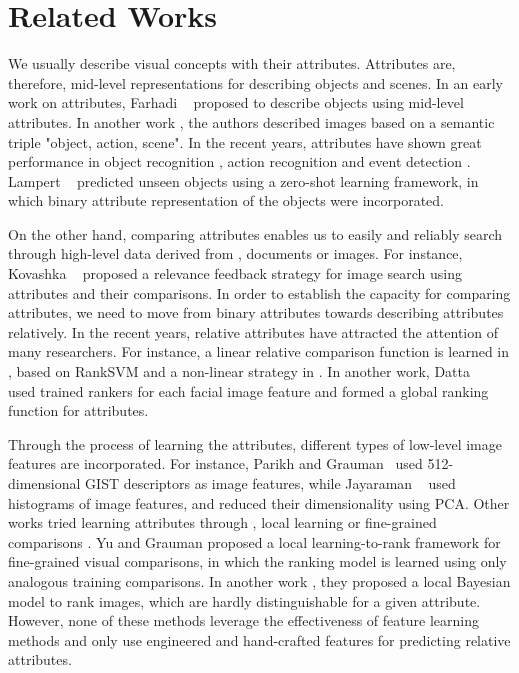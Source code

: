 

\section{Related Works}
\label{sec.2}

We usually describe visual concepts with their attributes.%
Attributes are, therefore, mid-level representations for describing objects and scenes. In an early work on attributes, Farhadi \etal~\cite{Farhadi09describingobjects} proposed to describe objects using mid-level attributes. In another work \cite{farhadi10}, the authors described images based on %
a semantic triple "object, action, scene". In the recent years, attributes have shown great performance in object recognition \cite{Farhadi09describingobjects,7298613}, action recognition \cite{6838985,5995353} and event detection \cite{6475038}. Lampert \etal~\cite{6571196} predicted unseen objects using a zero-shot learning framework, in which binary attribute representation of the objects were incorporated. 

On the other hand, comparing attributes enables us to easily and reliably search through high-level data derived from \eg, documents or images. For instance, Kovashka \etal~\cite{KovashkaG13} proposed a relevance feedback strategy for image search using attributes and their comparisons. In order to establish the capacity for comparing attributes, we need to move from binary attributes towards describing attributes relatively. In the recent years, relative attributes have attracted the attention of many researchers.
For instance, a linear relative comparison function is learned in \cite{parikh2011}, based on RankSVM \cite{Joachims2002} and a non-linear strategy in \cite{Li2013}. In another work, Datta \etal~\cite{5771429} used trained rankers for each facial image feature and formed a global ranking function for attributes.

Through the process of learning the attributes, different types of low-level image features are incorporated. For instance, Parikh and Grauman~\cite{parikh2011} used 512-dimensional GIST \cite{Aude01} descriptors as image features, while Jayaraman \etal~\cite{6909607} used histograms of image features, and reduced their dimensionality using PCA. Other works tried learning attributes through \eg, local learning \cite{1641014} or fine-grained comparisons \cite{Yu2014}. Yu and Grauman \cite{Yu2014} proposed a local learning-to-rank framework for fine-grained visual comparisons, in which the ranking model is learned using only analogous training comparisons. In another work \cite{Yu2015}, they proposed a local Bayesian model to rank images, which are hardly distinguishable for a given attribute. However, none of these methods leverage the effectiveness of feature learning methods and only use engineered and hand-crafted features for predicting relative attributes. %

